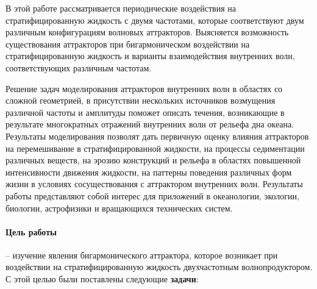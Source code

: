 \documentclass[utf8x]{G7-32} %
\begin{document}
В этой работе рассматривается периодические воздействия на стратифицированную жидкость с двумя частотами, которые соответствуют двум различным конфигурациям волновых аттракторов. Выясняется возможность существования аттракторов при бигармоническом воздействии на стратифицированную жидкость и варианты взаимодействия внутренних волн, соответствующих различным частотам. 

Решение задач моделирования аттракторов внутренних волн в областях со сложной геометрией, в присутствии нескольких источников возмущения различной частоты и амплитуды поможет описать течения, возникающие в результате многократных отражений внутренних волн от рельефа дна океана. Результаты моделирования позволят дать первичную оценку влияния аттракторов на перемешивание в стратифицированной жидкости, на процессы седиментации различных веществ, на эрозию конструкций и рельефа в областях повышенной интенсивности движения жидкости, на паттерны поведения различных форм жизни в условиях сосуществования с аттрактором внутренних волн. Результаты работы представляют собой интерес для приложений в океанологии, экологии, биологии, астрофизики и вращающихся технических систем. 

\paragraph{Цель работы} -- изучение явления бигармонического аттрактора, которое возникает при воздействии на стратифицированную жидкость двухчастотным волнопродуктором.  
С этой целью были поставлены следующие \textbf{задачи}:
\end{document}
